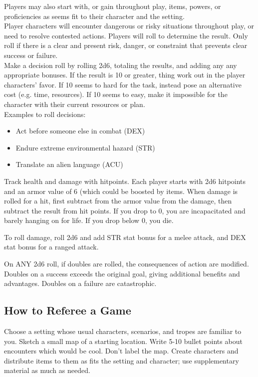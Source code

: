 \documentclass[a4,landscape]{book}
\begin{document}
\begin{multicols*}{4}
Players may also start with, or gain throughout play, items, powers, or proficiencies as seems fit to their character and the setting. \\

Player characters will encounter dangerous or risky situations throughout play, or need to resolve contested actions.
Players will roll to determine the result.
Only roll if there is a clear and present risk, danger, or constraint that prevents clear success or failure. \\

Make a decision roll by rolling 2d6, totaling the results, and adding any any appropriate bonuses.
If the result is 10 or greater, thing work out in the player characters' favor.
If 10 seems to hard for the task, instead pose an alternative cost (e.g. time, resources).
If 10 seems to easy, make it impossible for the character with their current resources or plan. \\

Examples to roll decisions:

\begin{itemize}
\item Act before someone else in combat (DEX)
\item Endure extreme environmental hazard (STR)
\item Translate an alien language (ACU)
\end{itemize}

Track health and damage with hitpoints.
Each player starts with 2d6 hitpoints and an armor value of 6 (which could be boosted by items.
When damage is rolled for a hit, first subtract from the armor value from the damage, then subtract the result from hit points.
If you drop to 0, you are incapacitated and barely hanging on for life.
If you drop below 0, you die.

To roll damage, roll 2d6 and add STR stat bonus for a melee attack, and DEX stat bonus for a ranged attack.

On ANY 2d6 roll, if doubles are rolled, the consequences of action are modified.
Doubles on a success exceeds the original goal, giving additional benefits and advantages.
Doubles on a failure are catastrophic. 

\subsection*{How to Referee a Game}

Choose a setting whose usual characters, scenarios, and tropes are familiar to you.
Sketch a small map of a starting location.
Write 5-10 bullet points about encounters which would be cool.
Don't label the map.
Create characters and distribute items to them as fits the setting and character; use supplementary material as much as needed. \\


\end{multicols*}
\end{document}
